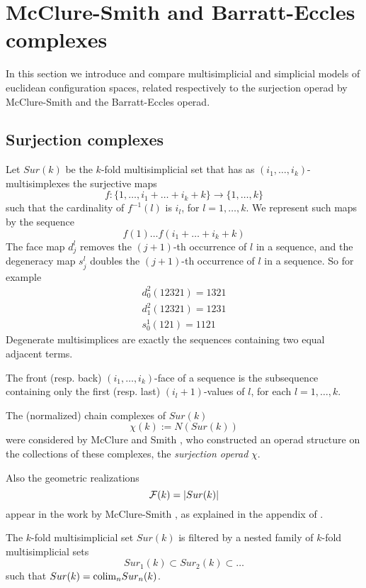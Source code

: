 
\section{McClure-Smith and Barratt-Eccles  complexes } 

In this section we introduce and compare   multisimplicial and  simplicial  models of euclidean configuration spaces,
related respectively to the surjection operad by McClure-Smith and the Barratt-Eccles operad.

\subsection{Surjection complexes} 

\begin{definition}
Let $Sur(k)$  be the $k$-fold multisimplicial set that has 
as $(i_1,\dots,i_k)$-multisimplexes
the surjective maps $$f:\{1,\dots,i_1+\dots+i_k+k\} \to  \{1,\dots,k\}$$ such that
the cardinality of $f^{-1}(l)$ is $i_l$, for $l=1,\dots,k$. We represent such maps by the sequence
$$f(1) \dots f(i_1+\dots+i_k+k)$$
The face map
$d^l_j$ removes the $(j+1)$-th occurrence of $l$ in a sequence, and the degeneracy map
$s^l_j$ doubles the $(j+1)$-th occurrence of $l$ in a sequence. 
So for example 
\begin{align*}d^2_0(12321)=1321 \\ d^2_1(12321)=1231 \\ s^1_0(121)=1121
\end{align*}
Degenerate multisimplices are exactly the sequences containing two equal adjacent terms.

The front  (resp. back) $(i_1,\dots,i_k)$-face of a sequence is the subsequence containing only the first (resp. last) 
$(i_l+1)$-values of $l$, for each
$l=1,\dots,k$.
\end{definition}


The (normalized) chain complexes 
of $Sur(k)$  $$\chi(k):=N(Sur(k))$$
were considered by McClure and Smith
\cite{MS},
who constructed an operad structure
on the collections of these complexes, the {\it surjection operad} $\chi$.


Also the geometric realizations 
$$\mathcal{F}(k)=\lvert Sur(k)\rvert$$ appear in the work by McClure-Smith \cite{MS}, as explained in the appendix of \cite{Deligne}.   

The $k$-fold multisimplicial set $Sur(k)$ is filtered
by a nested family of $k$-fold multisimplicial sets
$$Sur_1(k) \subset Sur_2(k)  \subset \dots $$ such that $Sur(k) = {\rm colim}_n Sur_n(k)$. 


